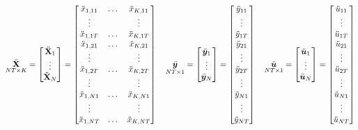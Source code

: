 \documentclass[11pt, oneside, a4paper, article]{article}
\numberwithin{equation}{section}
\begin{document}
\begin{align*}
\underset{NT \times K}{\ddot{\mathbf{X}}} = 
\begin{bmatrix}
\ddot{\mathbf{X}}_{1} \\ \vdots \\ \ddot{\mathbf{X}}_{N}
\end{bmatrix}
=
\begin{bmatrix}
	\ddot{x}_{1,11} & \dots & \ddot{x}_{K, 11} \\
	\vdots          &       &  \vdots          \\
	\ddot{x}_{1,1T} & \dots & \ddot{x}_{K, 1T} \\
	\ddot{x}_{1,21} & \dots & \ddot{x}_{K, 21} \\
	\vdots          &       &  \vdots          \\
	\ddot{x}_{1,2T} & \dots & \ddot{x}_{K, 2T} \\
	\vdots          &       &  \vdots          \\
	\ddot{x}_{1,N1} & \dots & \ddot{x}_{K, N1} \\
	\vdots          &       &  \vdots          \\
	\ddot{x}_{1,NT} & \dots & \ddot{x}_{K, NT}
\end{bmatrix}
\quad
\underset{NT \times 1}{\ddot{\boldsymbol{y}}} = 
\begin{bmatrix}
\ddot{\boldsymbol{y}}_{1} \\ \vdots \\ \ddot{\boldsymbol{y}}_{N}
\end{bmatrix}
=
\begin{bmatrix}
	\ddot{y}_{11} \\ \vdots \\ \ddot{y}_{1T} \\
	\ddot{y}_{21} \\ \vdots \\ \ddot{y}_{2T} \\
	\vdots \\
	\ddot{y}_{N1} \\ \vdots \\ \ddot{y}_{NT} \\
\end{bmatrix}
\quad
\underset{NT \times 1}{\ddot{\boldsymbol{u}}} = 
\begin{bmatrix}
\ddot{\boldsymbol{u}}_{1} \\ \vdots \\ \ddot{\boldsymbol{u}}_{N}
\end{bmatrix}
=
\begin{bmatrix}
	\ddot{u}_{11} \\ \vdots \\ \ddot{u}_{1T} \\
	\ddot{u}_{21} \\ \vdots \\ \ddot{u}_{2T} \\
	\vdots \\
	\ddot{u}_{N1} \\ \vdots \\ \ddot{u}_{NT} \\
\end{bmatrix}
\end{align*}
\end{document}
